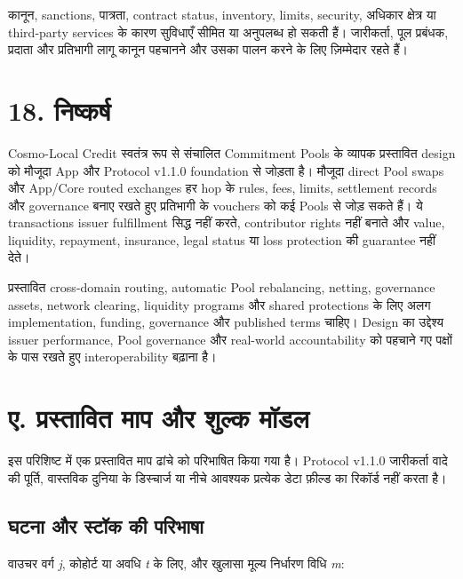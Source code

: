 \documentclass[11pt]{article}
\begin{document}
कानून, sanctions, पात्रता, contract status, inventory, limits, security, अधिकार क्षेत्र या third-party services के कारण सुविधाएँ सीमित या अनुपलब्ध हो सकती हैं। जारीकर्ता, पूल प्रबंधक, प्रदाता और प्रतिभागी लागू कानून पहचानने और उसका पालन करने के लिए ज़िम्मेदार रहते हैं।


\section*{18. निष्कर्ष}

Cosmo-Local Credit स्वतंत्र रूप से संचालित Commitment Pools के व्यापक प्रस्तावित design को मौजूदा App और Protocol v1.1.0 foundation से जोड़ता है। मौजूदा direct Pool swaps और App/Core routed exchanges हर hop के rules, fees, limits, settlement records और governance बनाए रखते हुए प्रतिभागी के vouchers को कई Pools से जोड़ सकते हैं। ये transactions issuer fulfillment सिद्ध नहीं करते, contributor rights नहीं बनाते और value, liquidity, repayment, insurance, legal status या loss protection की guarantee नहीं देते।

प्रस्तावित cross-domain routing, automatic Pool rebalancing, netting, governance assets, network clearing, liquidity programs और shared protections के लिए अलग implementation, funding, governance और published terms चाहिए। Design का उद्देश्य issuer performance, Pool governance और real-world accountability को पहचाने गए पक्षों के पास रखते हुए interoperability बढ़ाना है।


\section*{ए. प्रस्तावित माप और शुल्क मॉडल}

इस परिशिष्ट में एक प्रस्तावित माप ढांचे को परिभाषित किया गया है। Protocol v1.1.0 जारीकर्ता वादे की पूर्ति, वास्तविक दुनिया के डिस्चार्ज या नीचे आवश्यक प्रत्येक डेटा फ़ील्ड का रिकॉर्ड नहीं करता है।

\subsection*{घटना और स्टॉक की परिभाषा}

वाउचर वर्ग \emph{j}, कोहोर्ट या अवधि \emph{t} के लिए, और खुलासा मूल्य निर्धारण विधि \emph{m}:
\end{document}
